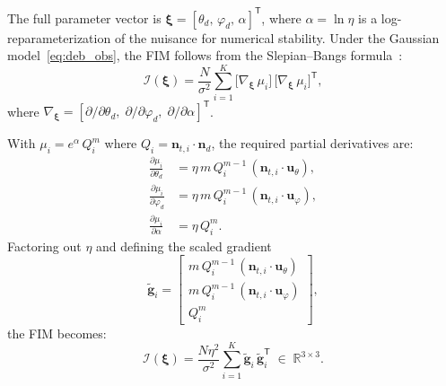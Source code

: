 \documentclass[journal]{IEEEtran}
\begin{document}
The full parameter vector is 
$\boldsymbol{\xi} = [\theta_d,\,\varphi_d,\,\alpha]^{\mathsf{T}}$,
where $\alpha = \ln\eta$ is a log-reparameterization of the nuisance 
for numerical stability.  Under the Gaussian model~\eqref{eq:deb_obs}, the 
FIM follows from the Slepian--Bangs formula~\cite{Kay1993}:
\begin{equation}
  \mathcal{I}(\boldsymbol{\xi})
  = \frac{N}{\sigma^2}
    \sum_{i=1}^{K}
    \bigl[\nabla_{\boldsymbol{\xi}}\,\mu_i\bigr]\,
    \bigl[\nabla_{\boldsymbol{\xi}}\,\mu_i\bigr]^{\!\mathsf{T}},
  \label{eq:deb_FIM}
\end{equation}
where $\nabla_{\boldsymbol\xi} = 
[\partial/\partial\theta_d,\;\partial/\partial\varphi_d,\;
\partial/\partial\alpha]^{\mathsf{T}}$.

With $\mu_i = e^\alpha\,Q_i^m$ where $Q_i = \mathbf{n}_{t,i}\cdot\mathbf{n}_d$, 
the required partial derivatives are:
\begin{subequations}\label{eq:deb_grads}
\begin{align}
  \frac{\partial\mu_i}{\partial\theta_d}
  &= \eta\,m\,Q_i^{m-1}\,
     (\mathbf{n}_{t,i}\cdot\mathbf{u}_\theta),
  \label{eq:deb_grad_theta}\\
  \frac{\partial\mu_i}{\partial\varphi_d}
  &= \eta\,m\,Q_i^{m-1}\,
     (\mathbf{n}_{t,i}\cdot\mathbf{u}_\varphi),
  \label{eq:deb_grad_phi}\\
  \frac{\partial\mu_i}{\partial\alpha}
  &= \eta\,Q_i^m.
  \label{eq:deb_grad_alpha}
\end{align}
\end{subequations}
Factoring out $\eta$ and defining the scaled gradient
\begin{equation}
  \tilde{\mathbf{g}}_i = 
  \begin{bmatrix}
    m\,Q_i^{m-1}\,(\mathbf{n}_{t,i}\cdot\mathbf{u}_\theta) \\
    m\,Q_i^{m-1}\,(\mathbf{n}_{t,i}\cdot\mathbf{u}_\varphi) \\
    Q_i^m
  \end{bmatrix},
  \label{eq:deb_gtilde}
\end{equation}
the FIM becomes:
\begin{equation}
  \mathcal{I}(\boldsymbol{\xi})
  = \frac{N\eta^2}{\sigma^2}
    \sum_{i=1}^{K}
    \tilde{\mathbf{g}}_i\,\tilde{\mathbf{g}}_i^{\mathsf{T}}
  \;\in\;\mathbb{R}^{3\times3}.
  \label{eq:deb_FIM_compact}
\end{equation}

\end{document}
